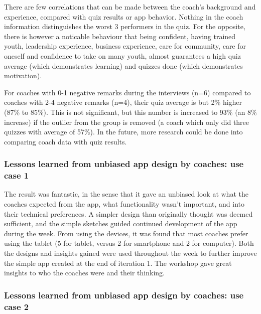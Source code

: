     There are few correlations that can be made between the coach's background and experience, compared with quiz results or app behavior. Nothing in the coach information distinguishes the worst 3 performers in the quiz. For the opposite, there is however a noticable behaviour that being confident, having trained youth, leadership experience, business experience, care for community, care for oneself and confidence to take on many youth, almost guarantees a high quiz average (which demonstrates learning) and quizzes done (which demonstrates motivation).

    For coaches with 0-1 negative remarks during the interviews (n=6) compared to coaches with 2-4 negative remarks (n=4), their quiz average is but 2\% higher (87\% to 85\%). This is not significant, but this number is increased to 93\% (an 8\% increase) if the outlier from the group is removed (a coach which only did three quizzes with average of 57\%). In the future, more research could be done into comparing coach data with quiz results.


    \subsubsection{Lessons learned from unbiased app design by coaches: use case 1}

    The result was fantastic, in the sense that it gave an unbiased look at what the coaches expected from the app, what functionality wasn't important, and into their technical preferences. A simpler design than originally thought was deemed sufficient, and the simple sketches guided continued development of the app during the week. From using the devices, it was found that most coaches prefer using the tablet (5 for tablet, versus 2 for smartphone and 2 for computer). Both the designs and insights gained were used throughout the week to further improve the simple app created at the end of iteration 1. The workshop gave great insights to who the coaches were and their thinking. 

    \subsubsection{Lessons learned from unbiased app design by coaches: use case 2}

